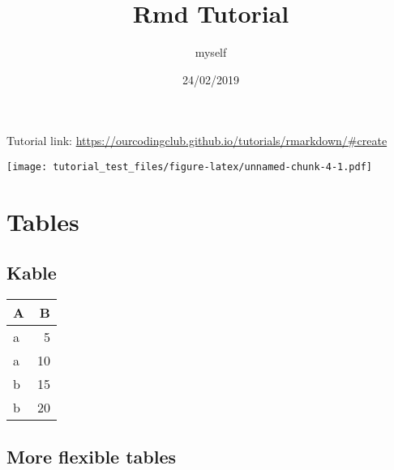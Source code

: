 \documentclass[
]{article}
\title{Rmd Tutorial}
\author{myself}
\date{24/02/2019}
\begin{document}
\maketitle

Tutorial link:
\url{https://ourcodingclub.github.io/tutorials/rmarkdown/\#create}

\texttt{[image: tutorial\_test\_files/figure-latex/unnamed-chunk-4-1.pdf]}

\hypertarget{tables}{%
\section{Tables}\label{tables}}

\hypertarget{kable}{%
\subsection{Kable}\label{kable}}

\begin{longtable}[]{@{}lr@{}}
\toprule
A & B\tabularnewline
\midrule
\endhead
a & 5\tabularnewline
a & 10\tabularnewline
b & 15\tabularnewline
b & 20\tabularnewline
\bottomrule
\end{longtable}

\hypertarget{more-flexible-tables}{%
\subsection{More flexible tables}\label{more-flexible-tables}}
\end{document}
